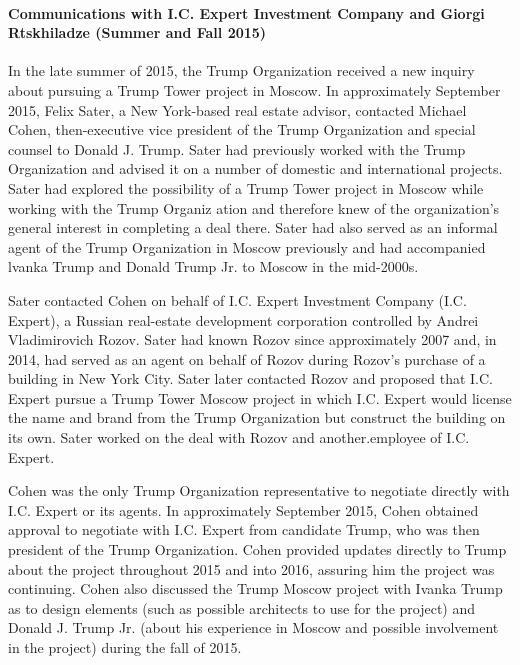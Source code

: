 \paragraph{Communications with I.C. Expert Investment Company and Giorgi Rtskhiladze (Summer and Fall 2015)}

In the late summer of 2015, the Trump Organization received a new inquiry about pursuing a Trump Tower project in Moscow.
In approximately September 2015, Felix Sater, a New York-based real estate advisor, contacted Michael Cohen, then-executive vice president of the Trump Organization and special counsel to Donald J. Trump.
Sater had previously worked with the Trump Organization and advised it on a number of domestic and international projects.
Sater had explored the possibility of a Trump Tower project in Moscow while working with the Trump Organiz ation and therefore knew of the organization's general interest in completing a  deal there.
Sater had also served as an informal agent of the Trump Organization in Moscow previously  and had accompanied lvanka Trump and Donald Trump Jr. to Moscow in the mid-2000s.

Sater contacted Cohen on behalf of I.C. Expert Investment Company (I.C. Expert), a Russian real-estate development corporation controlled by Andrei Vladimirovich Rozov.
Sater had known Rozov since approximately 2007 and, in 2014, had served as an agent on behalf of Rozov during Rozov's purchase of a building in New York City.
Sater later contacted Rozov and proposed that I.C. Expert pursue a Trump Tower Moscow project in which I.C. Expert would license the name and brand from the Trump Organization but construct the building on its own. Sater worked on the deal with Rozov and another.employee of I.C. Expert.

Cohen was the only Trump Organization representative to negotiate directly with I.C. Expert or its agents.
In approximately September 2015, Cohen obtained approval to negotiate with I.C. Expert from candidate Trump, who was then president of the Trump Organization.
Cohen provided updates directly to Trump about the project throughout 2015 and into 2016, assuring him the project was continuing.
Cohen also discussed the Trump Moscow project with Ivanka Trump as to design elements (such as possible architects to use for the project) and Donald J. Trump Jr. (about his experience in Moscow and possible involvement in the project) during the fall of 2015.

